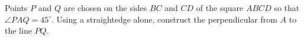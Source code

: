 Points $P$ and $Q$ are chosen on the sides $BC$ and $CD$ of the square $ABCD$ so that $\angle PAQ=45^\circ$. Using a straightedge alone, construct the perpendicular from $A$ to the line $PQ$.
